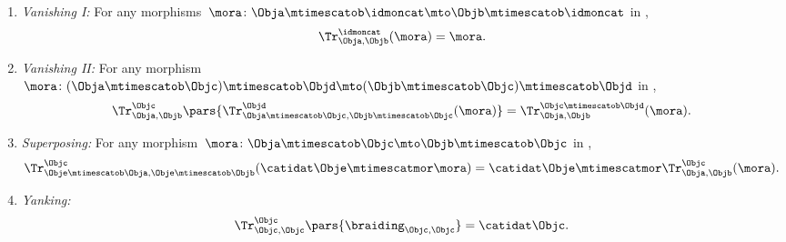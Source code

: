 \begin{ctdefinition}
\begin{enumerate}
        \item \emph{Vanishing I:}
              For any morphisms~$\mora \colon \Obja \mtimescatob \idmoncat \mto \Objb \mtimescatob \idmoncat$ in \CatC,
              \begin{equation}
                  \label{eq:vanishing_1}
                  \Tr_{\Obja,\Objb}^\idmoncat (\mora)=  \mora.
              \end{equation}
        \item \emph{Vanishing II:}
              For any morphism~$\mora \colon (\Obja\mtimescatob \Objc) \mtimescatob \Objd \mto (\Objb\mtimescatob \Objc) \mtimescatob \Objd$ in \CatC,
              \begin{equation}
                  \label{eq:vanishing_2}
                  \Tr_{\Obja,\Objb}^\Objc\pars{
                      \Tr_{\Obja \mtimescatob \Objc, \Objb \mtimescatob \Objc}^\Objd(\mora)} = \Tr_{\Obja,\Objb}^{\Objc\mtimescatob \Objd}( \mora ).
              \end{equation}
        \item \emph{Superposing:}
              For any morphism~$\mora\colon \Obja\mtimescatob \Objc \mto \Objb\mtimescatob \Objc$ in \CatC,
              \begin{equation}
                  \label{eq:superposing}
                  \Tr_{\Obje\mtimescatob \Obja,\Obje\mtimescatob \Objb}^{\Objc}( \catidat\Obje\mtimescatmor \mora )=\catidat\Obje\mtimescatmor \Tr_{\Obja,\Objb}^\Objc(\mora).
              \end{equation}
        \item \emph{Yanking:}
              \begin{equation}
                  \label{eq:yanking}
                  \Tr_{\Objc,\Objc}^\Objc\pars{\braiding_{\Objc,\Objc}}=\catidat\Objc.
              \end{equation}
    \end{enumerate}
\end{ctdefinition}

